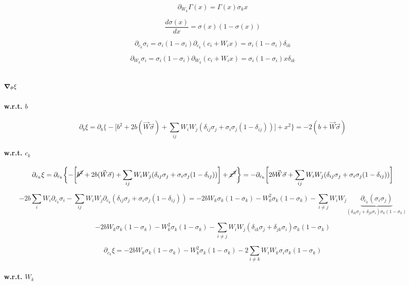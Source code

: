 \documentclass{book}
\begin{document}
\[\partial_{W_k}\Gamma(x)=\Gamma(x)\sigma_k x\]

\[\frac{d\sigma(x)}{dx}=\sigma(x)(1-\sigma(x))\]

\[\partial_{c_k}\sigma_i=\sigma_i(1-\sigma_i)\partial_{c_k}(c_i+W_ix)=\sigma_i(1-\sigma_i)\delta_{ik}\]

\[\partial_{W_k}\sigma_i=\sigma_i(1-\sigma_i)\partial_{W_k}(c_i+W_ix)=\sigma_i(1-\sigma_i)x\delta_{ik}\]

\subsection{$\grad_\theta\xi$}

\paragraph{w.r.t. $b$}

\[\partial_b\xi=\partial_b\biggl\{-\biggl[b^2+2b(\vec{W}\vec{\sigma})+\sum_{ij}W_iW_j(\delta_{ij}\sigma_j+\sigma_i\sigma_j(1-\delta_{ij}))\biggr]+x^2\biggr\}=-2(b+\vec{W}\vec{\sigma})\]

\paragraph{w.r.t. $c_k$}

\[\partial_{c_k}\xi=\partial_{c_k}\biggl\{-\biggl[\cancel{b^2}+2b(\vec{W}\vec{\sigma})+\sum_{ij}W_iW_j(\delta_{ij}\sigma_j+\sigma_i\sigma_j(1-\delta_{ij}))\biggr]+\cancel{x^2}\biggr\}=-\partial_{c_k}\bigg[2b\vec{W}\vec{\sigma}+\sum_{ij}W_iW_j(\delta_{ij}\sigma_j+\sigma_i\sigma_j(1-\delta_{ij}))\bigg]\]

\[-2b\sum_i W_i\partial_{c_k}\sigma_i-\sum_{ij}W_iW_j\partial_{c_k}(\delta_{ij}\sigma_j+\sigma_i\sigma_j(1-\delta_{ij}))=-2bW_k\sigma_k(1-\sigma_k)-W_k ^2\sigma_k(1-\sigma_k)-\sum_{i\neq j}W_iW_j\underbrace{\partial_{c_k}(\sigma_i\sigma_j)}_{(\delta_{ik}\sigma_j+\delta_{jk}\sigma_i)\sigma_k(1-\sigma_k)}\]

\[-2bW_k\sigma_k(1-\sigma_k)-W_k ^2\sigma_k(1-\sigma_k)-\sum_{i\neq j}W_iW_j{(\delta_{ik}\sigma_j+\delta_{jk}\sigma_i)\sigma_k(1-\sigma_k)}\]

\[\partial_{c_k}\xi=-2bW_k\sigma_k(1-\sigma_k)-W_k ^2\sigma_k(1-\sigma_k)-2\sum_{i\neq k}W_iW_k{\sigma_i\sigma_k(1-\sigma_k)}\]

\paragraph{w.r.t. $W_k$}
\end{document}
